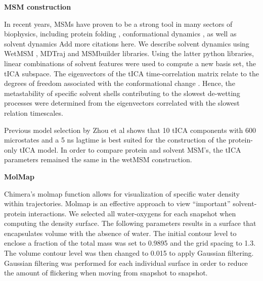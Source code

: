 \textbf{MSM construction}

In recent years, MSMs have proven to be a strong tool in many
sectors of biophysics, including protein folding \cite{lane2011markov,voelz2012slow},
conformational dynamics \cite{zhou2017bridging}, as well as solvent dynamics \cite{harrigan2015conserve} {\color{red}Add more citations here}. We
describe solvent dynamics using WetMSM \cite{harrigan2015conserve}, MDTraj \cite{mcgibbon2015mdtraj} and MSMbuilder
\cite{harrigan2017msmbuilder} libraries. Using the latter python libraries, linear combinations
of solvent features were used to compute a new basis set, the tICA
subspace. The eigenvectors of the tICA time-correlation matrix relate to
the degrees of freedom associated with the conformational change \cite{bowman2013introduction}.
Hence, the metastability of specific solvent shells contributing to the
slowest de-wetting processes were determined from the eigenvectors
correlated with the slowest relation timescales.

Previous model selection by Zhou et al \cite{zhou2017bridging} shows that 10 tICA components with 600 microstates and a 5 ns lagtime is best suited for the construction of the
protein-only tICA model. In order to compare protein and solvent MSM's,
the tICA parameters remained the same in the wetMSM \cite{harrigan2015conserve} construction.

\textbf{MolMap }

Chimera's molmap \cite{pettersen2004ucsf} function allows for visualization of specific
water density within trajectories. Molmap is an effective approach to view ``important''
solvent-protein interactions. We selected all water-oxygens for each snapshot when computing the density surface. The following parameters results in a surface that encapsulates volume with the absence of water.  The initial contour level to enclose a fraction of the total mass was set to 0.9895 and the grid spacing to 1.3. The volume contour level was then changed to 0.015 to apply Gaussian filtering. Gaussian filtering was performed for each individual surface in order to reduce the amount of flickering when
moving from snapshot to snapshot.


